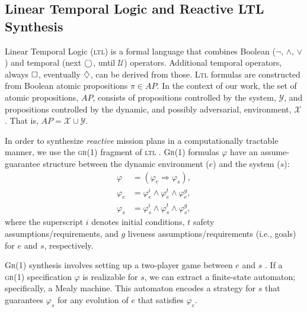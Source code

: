 \subsection{Linear Temporal Logic and Reactive LTL Synthesis}\label{S:GR1}

Linear Temporal Logic (\textsc{ltl}) is a formal language that combines Boolean ($\lnot$, $\wedge$, $\lor$) and temporal (next $\operatorname{\bigcirc}$, until $\mathcal{U}$) operators.
Additional temporal operators, always $\operatorname{\Box}$, eventually $\operatorname{\diamondsuit}$, can be derived from those.
\textsc{Ltl} formulas are constructed from Boolean atomic propositions $\pi \in AP$.
In the context of our work, the set of atomic propositions, $AP$, consists of propositions controlled by the system, $\mathcal{Y}$, and propositions controlled by the dynamic, and possibly adversarial, environment, $\mathcal{X}$. That is, $AP = \mathcal{X} \cup \mathcal{Y}$.

In order to synthesize \emph{reactive} mission plans in a computationally tractable manner, we use the \textsc{gr(1)} fragment of \textsc{ltl} \cite{piterman_06}.
\textsc{Gr(1)} formulas $\varphi$ have an assume-guarantee structure between the dynamic environment ($e$) and the system ($s$):
\begin{equation}\label{GR1Formula}
\begin{split}
	\varphi &= (\varphi_e \Rightarrow \varphi_s),\\
	\varphi_e &= \varphi_e^i \wedge \varphi_e^t \wedge \varphi_e^g,\\
	\varphi_s &= \varphi_s^i \wedge \varphi_s^t \wedge \varphi_s^g,
\end{split}
\end{equation}
where the superscript $i$ denotes initial conditions, $t$ safety assumptions/requirements, and $g$ liveness assumptions/requirements (i.e., goals) for $e$ and $s$, respectively. 

\textsc{Gr(1)} synthesis involves setting up a two-player game between $e$ and $s$ \cite{piterman_06}.
If a \textsc{gr(1)} specification $\varphi$ is realizable for $s$, we can extract a finite-state automaton; specifically, a Mealy machine. 
This automaton encodes a strategy for $s$ that guarantees $\varphi_s$ for any evolution of $e$ that satisfies $\varphi_e$.

